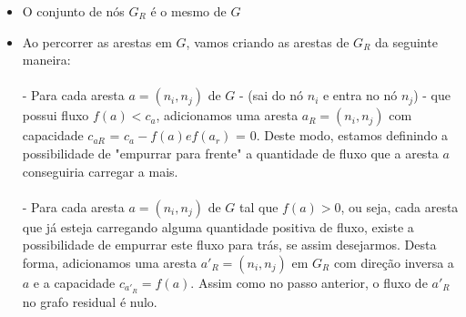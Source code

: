 \begin{itemize}
  \item O conjunto de nós $G_{R}$ é o mesmo de $G$
  \item Ao percorrer as arestas em $G$, vamos criando as arestas de $G_{R}$ da seguinte maneira:
  \\\\
   - Para cada aresta $a = (n_{i},n_{j})$ de $G$ - (sai do nó $n_{i}$ e entra no nó $n_{j}$) - que possui fluxo $f(a) < c_{a}$, adicionamos uma aresta $a_{R} = (n_{i},n_{j})$ com capacidade $c_{aR}$ = $c_{a} - f(a) e f(a_{r})$ = 0. Deste modo, estamos definindo a possibilidade de "empurrar para frente" a quantidade de fluxo que a aresta $a$ conseguiria carregar a mais.
   \\\\
   - Para cada aresta $a = (n_{i},n_{j})$ de $G$ tal que $f(a) > 0$, ou seja, cada aresta que já esteja carregando alguma quantidade positiva de fluxo, existe a possibilidade de empurrar este fluxo para trás, se assim desejarmos. Desta forma, adicionamos uma aresta $a{'}_{R} = (n_{i},n_{j})$  em $G_{R}$ com direção inversa a $a$ e a capacidade $c_{a{'}_{R}} = f(a)$. Assim como no passo anterior, o fluxo de $a{'}_{R}$ no grafo residual é nulo.
\end{itemize}
\newpage


